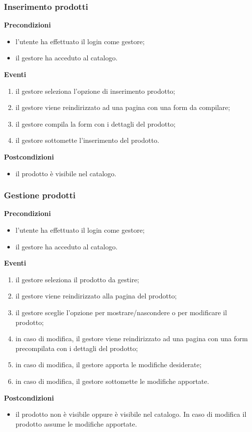 \documentclass[a4paper, 14pt]{article}
\begin{document}
\begin{flushleft}
			\bigskip
			\subsubsection{Inserimento prodotti}
			\textbf{Precondizioni}
			\begin{itemize}
				\item l'utente ha effettuato il login come gestore;
				\item il gestore ha acceduto al catalogo.
			\end{itemize}
			\textbf{Eventi}
			\begin{enumerate}
				\item il gestore seleziona l'opzione di inserimento prodotto;
				\item il gestore viene reindirizzato ad una pagina con una form da compilare;
				\item il gestore compila la form con i dettagli del prodotto;
				\item il gestore sottomette l'inserimento del prodotto.
			\end{enumerate}
			\textbf{Postcondizioni}
			\begin{itemize}
				\item il prodotto è visibile nel catalogo.
			\end{itemize}
			
			\bigskip
			\subsubsection{Gestione prodotti}
			\textbf{Precondizioni}
			\begin{itemize}
				\item l'utente ha effettuato il login come gestore;
				\item il gestore ha acceduto al catalogo.
			\end{itemize}
			\textbf{Eventi}
			\begin{enumerate}
				\item il gestore seleziona il prodotto da gestire;
				\item il gestore viene reindirizzato alla pagina del prodotto;
				\item il gestore sceglie l'opzione per mostrare/nascondere o per modificare il prodotto;
				\item in caso di modifica, il gestore viene reindirizzato ad una pagina con una form precompilata con i dettagli del prodotto;
				\item in caso di modifica, il gestore apporta le modifiche desiderate;
				\item in caso di modifica, il gestore sottomette le modifiche apportate.
			\end{enumerate}
			\textbf{Postcondizioni}
			\begin{itemize}
				\item il prodotto non è visibile oppure è visibile nel catalogo. In caso di modifica il prodotto assume le modifiche apportate.
			\end{itemize}
		

\end{flushleft}
\end{document}
